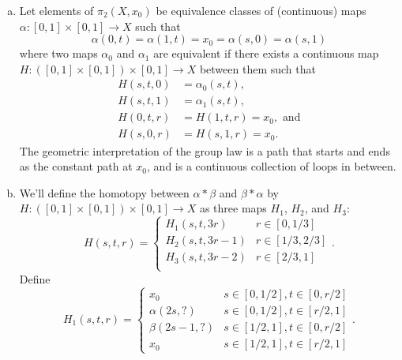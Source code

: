 \documentclass{article}
\newenvironment{solution}[1][Solution.]{\begin{trivlist}
\item[\hskip \labelsep {\bfseries #1}]}{\end{trivlist}}
\begin{document}
\begin{solution} \text{}
  \begin{enumerate}[a.]
    \item Let elements of $\pi_2(X, x_0)$ be equivalence classes of
    (continuous) maps $\alpha\colon [0,1] \times [0, 1] \rightarrow X$ such
    that \[
      \alpha(0, t) = \alpha(1, t) = x_0 = \alpha(s, 0) = \alpha(s, 1)
    \] where two maps $\alpha_0$ and $\alpha_1$ are equivalent if there exists a
    continuous map $H\colon ([0, 1] \times [0, 1]) \times [0, 1] \rightarrow X$
    between them such that \begin{align*}
      H(s, t, 0) &= \alpha_0(s, t), \\
      H(s, t, 1) &= \alpha_1(s, t), \\
      H(0, t, r) &= H(1, t, r) = x_0, \text{ and} \\
      H(s, 0, r) &= H(s, 1, r) = x_0.
    \end{align*}
    The geometric interpretation of the group law is a path that starts and ends
    as the constant path at $x_0$, and is a continuous collection of loops
    in between.
    \item We'll define the homotopy between $\alpha * \beta$ and
    $\beta * \alpha$ by
      $H\colon ([0, 1] \times [0, 1]) \times [0, 1] \rightarrow X$
    as three maps $H_1$, $H_2$, and $H_3$: \[
      H(s, t, r) = \begin{cases}
        H_1(s, t, 3r)     & r \in [0, 1/3] \\
        H_2(s, t, 3r - 1) & r \in [1/3, 2/3] \\
        H_3(s, t, 3r - 2) & r \in [2/3, 1] \\
      \end{cases}.
    \]
    Define \[
      H_1(s, t, r) = \begin{cases}
        x_0 & s \in [0, 1/2], t \in [0, r/2] \\
        \alpha(2s, ?) & s \in [0, 1/2], t \in [r/2, 1] \\
        \beta(2s - 1, ?) & s \in [1/2, 1], t \in [0, r/2] \\
        x_0 & s \in [1/2, 1], t \in [r/2, 1]
      \end{cases}.
    \]


\end{enumerate}
\end{solution}
\end{document}
